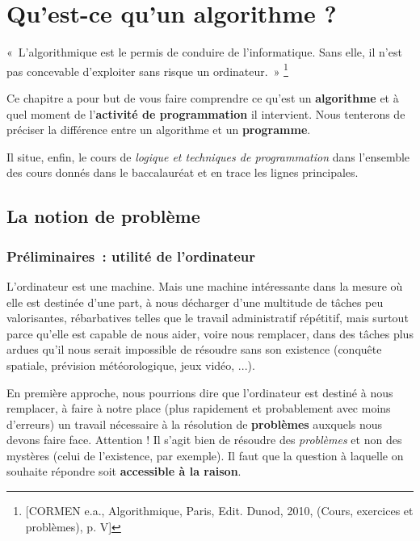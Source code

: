 \chapter{Qu'est-ce qu'un algorithme ?}

\begin{Exergue}
	«~L'algorithmique est le permis de conduire de l'informatique.
	Sans elle, il n'est pas concevable d'exploiter sans risque un ordinateur.~»
	\footnote{[CORMEN e.a., Algorithmique, Paris, Edit. Dunod, 2010, (Cours, 
	exercices et problèmes), p. V] }
\end{Exergue}

Ce chapitre a pour but de vous faire comprendre ce
qu'est un \textbf{algorithme} et à quel moment de
l'\textbf{activité de programmation} il intervient. 
Nous tenterons de préciser la différence entre un algorithme 
et un \textbf{programme}.

Il situe, enfin, le cours de \textit{logique et techniques de
programmation} dans l’ensemble des cours donnés dans le baccalauréat et
en trace les lignes principales.

\section{La notion de problème}

	\subsection{Préliminaires~: utilité de l’ordinateur}
	
		L’ordinateur est une machine. Mais une machine intéressante dans la
		mesure où elle est destinée d’une part, à nous décharger d’une
		multitude de tâches peu valorisantes, rébarbatives telles que le
		travail administratif répétitif, mais surtout parce qu’elle est capable
		de nous aider, voire nous remplacer, dans des tâches plus ardues qu’il
		nous serait impossible de résoudre sans son existence (conquête
		spatiale, prévision météorologique, jeux vidéo, ...).
		
		En première approche, nous pourrions dire que l’ordinateur est destiné à
		nous remplacer, à faire à notre place (plus rapidement et probablement
		avec moins d’erreurs) un travail nécessaire à la résolution de
		\textbf{problèmes} auxquels nous devons faire face. Attention ! Il
		s’agit bien de résoudre des \textit{problèmes} et non des mystères
		(celui de l’existence, par exemple). Il faut que la question à laquelle
		on souhaite répondre soit \textbf{accessible à la raison}.


